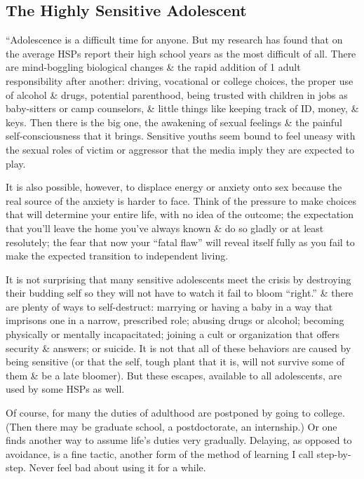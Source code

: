 \documentclass{article}
\numberwithin{equation}{section}
\begin{document}
\subsection{The Highly Sensitive Adolescent}
``Adolescence is a difficult time for anyone. But my research has found that on the average HSPs report their high school years as the most difficult of all. There are mind-boggling biological changes \& the rapid addition of 1 adult responsibility after another: driving, vocational or college choices, the proper use of alcohol \& drugs, potential parenthood, being trusted with children in jobs as baby-sitters or camp counselors, \& little things like keeping track of ID, money, \& keys. Then there is the big one, the awakening of sexual feelings \& the painful self-consciousness that it brings. Sensitive youths seem bound to feel uneasy with the sexual roles of victim or aggressor that the media imply they are expected to play.

It is also possible, however, to displace energy or anxiety onto sex because the real source of the anxiety is harder to face. Think of the pressure to make choices that will determine your entire life, with no idea of the outcome; the expectation that you'll leave the home you've always known \& do so gladly or at least resolutely; the fear that now your ``fatal flaw'' will reveal itself fully as you fail to make the expected transition to independent living.

It is not surprising that many sensitive adolescents meet the crisis by destroying their budding self so they will not have to watch it fail to bloom ``right.'' \& there are plenty of ways to self-destruct: marrying or having a baby in a way that imprisons one in a narrow, prescribed role; abusing drugs or alcohol; becoming physically or mentally incapacitated; joining a cult or organization that offers security \& answers; or suicide. It is not that all of these behaviors are caused by being sensitive (or that the self, tough plant that it is, will not survive some of them \& be a late bloomer). But these escapes, available to all adolescents, are used by some HSPs as well.

Of course, for many the duties of adulthood are postponed by going to college. (Then there may be graduate school, a postdoctorate, an internship.) Or one finds another way to assume life's duties very gradually. Delaying, as opposed to avoidance, is a fine tactic, another form of the method of learning I call step-by-step. Never feel bad about using it for a while.
\end{document}
